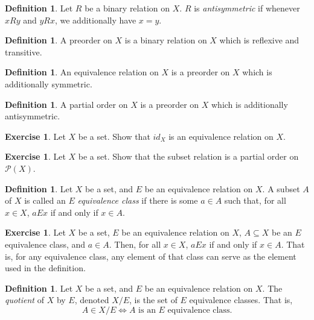 \documentclass[letterpaper]{article}
\theoremstyle{definition}
\newtheorem{definition}[theorem]{Definition}
\newtheorem{exercise}[theorem]{Exercise}
\newcommand{\defterm}{\emph}
\renewcommand{\subset}{\subseteq}
\newcommand{\powerset}{\mathcal{P}}
\begin{document}
\begin{definition}
  Let \(R\) be a binary relation on \(X\).  \(R\) is
  \defterm{antisymmetric} if whenever \(xRy\) and \(yRx\), we
  additionally have \(x = y\).
\end{definition}

\begin{definition}
  A preorder on \(X\) is a binary relation on \(X\) which is reflexive
  and transitive.
\end{definition}

\begin{definition}
  An equivalence relation on \(X\) is a preorder on \(X\) which is
  additionally symmetric.
\end{definition}

\begin{definition}
  A partial order on \(X\) is a preorder on \(X\) which is
  additionally antisymmetric.
\end{definition}

\begin{exercise}
  Let \(X\) be a set.  Show that \(id_X\) is an equivalence relation
  on \(X\).
\end{exercise}

\begin{exercise}
  Let \(X\) be a set.  Show that the subset relation is a partial
  order on \(\powerset(X)\).
\end{exercise}

\begin{definition}
  Let \(X\) be a set, and \(E\) be an equivalence relation on \(X\).
  A subset \(A\) of \(X\) is called an \(E\) \defterm{equivalence
    class} if there is some \(a \in A\) such that, for all \(x \in
  X\), \(aEx\) if and only if \(x \in A\).
\end{definition}

\begin{exercise}
  Let \(X\) be a set, \(E\) be an equivalence relation on \(X\), \(A
  \subset X\) be an \(E\) equivalence class, and \(a \in A\).  Then,
  for all \(x \in X\), \(aEx\) if and only if \(x \in A\).  That is,
  for any equivalence class, any element of that class can serve as
  the element used in the definition.
\end{exercise}

\begin{definition}
  Let \(X\) be a set, and \(E\) be an equivalence relation on \(X\).
  The \defterm{quotient} of \(X\) by \(E\), denoted \(X/E\), is the
  set of \(E\) equivalence classes.  That is,
  \[A \in X/E \iff A \text{ is an } E \text{ equivalence class.}\]
\end{definition}
\end{document}
